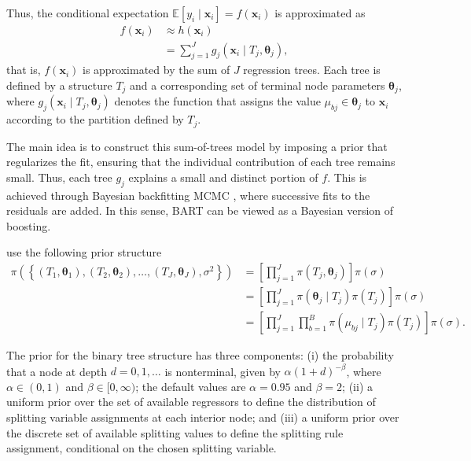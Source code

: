 Thus, the conditional expectation \( \mathbb{E}[y_i \mid \mathbf{x}_i] = f(\mathbf{x}_i) \) is approximated as
\begin{align}\label{eq:BART}
	f(\mathbf{x}_i) & \approx h(\mathbf{x}_i) \nonumber \\
	&= \sum_{j=1}^J g_j(\mathbf{x}_i \mid T_j, \boldsymbol{\theta}_j),
\end{align}
that is, \( f(\mathbf{x}_i) \) is approximated by the sum of \( J \) regression trees. Each tree is defined by a structure \( T_j \) and a corresponding set of terminal node parameters \( \boldsymbol{\theta}_j \), where \( g_j(\mathbf{x}_i \mid T_j, \boldsymbol{\theta}_j) \) denotes the function that assigns the value \( \mu_{bj} \in \boldsymbol{\theta}_j \) to \( \mathbf{x}_i \) according to the partition defined by \( T_j \).

The main idea is to construct this sum-of-trees model by imposing a prior that regularizes the fit, ensuring that the individual contribution of each tree remains small. Thus, each tree \( g_j \) explains a small and distinct portion of \( f \). This is achieved through Bayesian backfitting MCMC \cite{hastie2000bayesian}, where successive fits to the residuals are added. In this sense, BART can be viewed as a Bayesian version of boosting.

\cite{chipman2010bart} use the following prior structure
\begin{align*}
	\pi(\left\{(T_1,\boldsymbol{\theta}_1),(T_2,\boldsymbol{\theta}_2),\dots, (T_J,\boldsymbol{\theta}_J),\sigma^2\right\})&=\left[\prod_{j=1}^J\pi(T_j,\boldsymbol{\theta}_j)\right]\pi(\sigma)\\
	&=\left[\prod_{j=1}^J\pi(\boldsymbol{\theta}_j\mid T_j)\pi(T_j)\right]\pi(\sigma)\\
	&=\left[\prod_{j=1}^J\prod_{b=1}^B\pi(\mu_{bj}\mid T_j)\pi(T_j)\right]\pi(\sigma).
\end{align*}  

The prior for the binary tree structure has three components: (i) the probability that a node at depth \( d = 0, 1, \dots \) is nonterminal, given by \( \alpha(1 + d)^{-\beta} \), where \( \alpha \in (0,1) \) and \( \beta \in [0, \infty) \); the default values are \( \alpha = 0.95 \) and \( \beta = 2 \); (ii) a uniform prior over the set of available regressors to define the distribution of splitting variable assignments at each interior node; and (iii) a uniform prior over the discrete set of available splitting values to define the splitting rule assignment, conditional on the chosen splitting variable.

